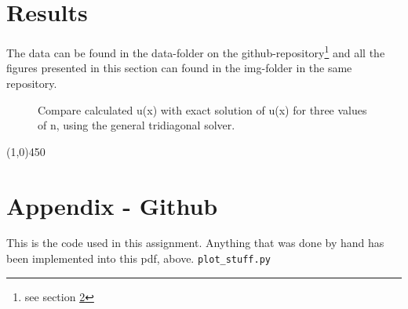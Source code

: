 \documentclass[11pt,a4paper,notitlepage]{article}
\begin{document}
\section{Results}
\label{section:results}
	The data can be found in the data-folder on the github-repository\footnote{see section \ref{section:github}} and all the figures presented in this section can found in the img-folder in the same repository. \\
	\begin{figure}
		\caption{Compare calculated u(x) with exact solution of u(x) for three values of n, using the general tridiagonal solver.}
	\end{figure}
	
\begin{center}
\line(1,0){450}
\end{center}

\newpage
\section{Appendix - Github}
\label{section:github}
This is the code used in this assignment. Anything that was done by hand has been implemented into this pdf, above.
\lstset{style=pystyle}
\verb|plot_stuff.py|

\end{document}
